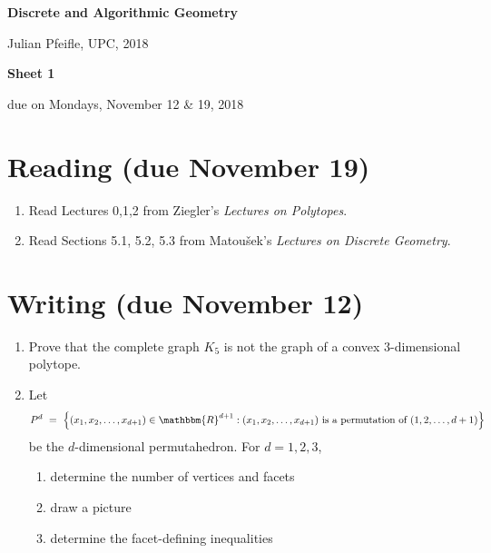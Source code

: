 \documentclass[11pt]{amsart}
\newcommand{\RR}{\mathbbm{R}}
\begin{document}
\begin{center}
\textbf{\sffamily
   Discrete and Algorithmic Geometry }

\medskip
   Julian Pfeifle,
   UPC, 2018
\end{center}

\bigskip

\begin{center}
  \textbf{\sffamily Sheet 1}

\bigskip
 due on Mondays, November 12 \& 19, 2018

\end{center}

\bigskip
\bigskip
\bigskip

\section*{Reading (due November 19)}

\begin{enumerate}
\setlength{\itemsep}{2ex}
\item Read Lectures 0,1,2 from Ziegler's \emph{Lectures on Polytopes}.

\item Read Sections 5.1, 5.2, 5.3 from Matou\v sek's \emph{Lectures on
    Discrete Geometry}.

\end{enumerate}

\bigskip
\bigskip
\section*{Writing (due November 12)}
\begin{enumerate}
\item Prove that the complete graph $K_5$ is not the graph of a convex $3$-dimensional polytope.

  \bigskip\bigskip
\item Let
  \[
    P^d
    \ = \
    \Big\{(x_1,x_2,\dots,x_{d+1})\in \RR^{d+1} : (x_1,x_2,\dots,x_{d+1}) \text{ is a permutation of } (1,2,\dots,d+1)\Big\}
  \]
  be the $d$-dimensional permutahedron.
  For $d=1,2,3$,
  \begin{enumerate}
  \item determine the number of vertices and facets
  \item draw a picture
  \item determine the facet-defining inequalities
  \end{enumerate}
\end{enumerate}
\end{document}
